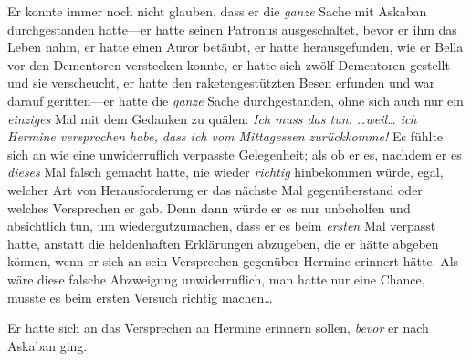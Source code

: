 Er konnte immer noch nicht glauben, dass er die \emph{ganze} Sache mit Askaban durchgestanden hatte—er hatte seinen Patronus ausgeschaltet, bevor er ihm das Leben nahm, er hatte einen Auror betäubt, er hatte herausgefunden, wie er Bella vor den Dementoren verstecken konnte, er hatte sich zwölf Dementoren gestellt und sie verscheucht, er hatte den raketengestützten Besen erfunden und war darauf geritten—er hatte die \emph{ganze} Sache durchgestanden, ohne sich auch nur ein \emph{einziges} Mal mit dem Gedanken zu quälen: \emph{Ich muss das tun. …weil… ich Hermine versprochen habe, dass ich vom Mittagessen zurückkomme!} Es fühlte sich an wie eine unwiderruflich verpasste Gelegenheit; als ob er es, nachdem er es \emph{dieses} Mal falsch gemacht hatte, nie wieder \emph{richtig} hinbekommen würde, egal, welcher Art von Herausforderung er das nächste Mal gegenüberstand oder welches Versprechen er gab. Denn dann würde er es nur unbeholfen und absichtlich tun, um wiedergutzumachen, dass er es beim \emph{ersten} Mal verpasst hatte, anstatt die heldenhaften Erklärungen abzugeben, die er hätte abgeben können, wenn er sich an sein Versprechen gegenüber Hermine erinnert hätte. Als wäre diese falsche Abzweigung unwiderruflich, man hatte nur eine Chance, musste es beim ersten Versuch richtig machen…

Er hätte sich an das Versprechen an Hermine erinnern sollen, \emph{bevor} er nach Askaban ging.

